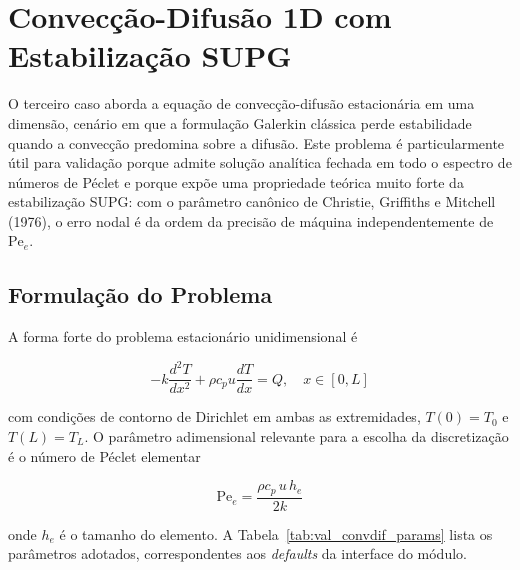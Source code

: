 \section{Convecção-Difusão 1D com Estabilização SUPG}
\label{sec:val_convdif}

O terceiro caso aborda a equação de convecção-difusão estacionária em uma dimensão, cenário em que a formulação Galerkin clássica perde estabilidade quando a convecção predomina sobre a difusão. Este problema é particularmente útil para validação porque admite solução analítica fechada em todo o espectro de números de Péclet e porque expõe uma propriedade teórica muito forte da estabilização SUPG: com o parâmetro canônico de Christie, Griffiths e Mitchell (1976), o erro nodal é da ordem da precisão de máquina independentemente de $\mathrm{Pe}_e$.

\subsection{Formulação do Problema}

A forma forte do problema estacionário unidimensional é

\begin{equation}
    -k \frac{d^2 T}{dx^2} + \rho c_p u \frac{dT}{dx} = Q, \quad x \in [0, L]
    \label{eq:val_convdif_edp}
\end{equation}

\noindent com condições de contorno de Dirichlet em ambas as extremidades, $T(0) = T_0$ e $T(L) = T_L$. O parâmetro adimensional relevante para a escolha da discretização é o número de Péclet elementar

\begin{equation}
    \mathrm{Pe}_e = \frac{\rho c_p \, u \, h_e}{2 k}
    \label{eq:val_convdif_pe}
\end{equation}

\noindent onde $h_e$ é o tamanho do elemento. A Tabela~\ref{tab:val_convdif_params} lista os parâmetros adotados, correspondentes aos \emph{defaults} da interface do módulo.

